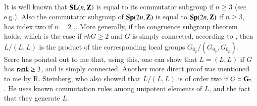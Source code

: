 \subsection{}\label{art04-sec2.5}
It is well known that $\textbf{SL}(n,\mathbf{Z})$ is equal to its commutator subgroup if $n\geq 3$ (see \cite{art04-key3} e.g.). Also the commutator subgroup of $\mathbf{Sp}(2n,\mathbf{Z})$ is equal to $\mathbf{Sp}(2n,\mathbf{Z})$ if $n\geq 3$, has index two if $n=2$ \cite{art04-key3},\pageoriginale \cite{art04-key28}. More generally, if the congruence subgroup theorem holds, which is the case if $rkG\geq 2$ and $G$ is simply connected, according to \cite{art04-key22}, then $L/(L,L)$ is the product of the corresponding local groups $G_{0_{p}}/(G_{0_{p}},G_{0_{p}})$. Serre has pointed out to me that, using this, one can show that $L=(L,L)$ if $G$ has $\operatorname{\mathrm{rank}} \geq 3$, and is simply connected. Another more direct proof was mentioned to me by R. Steinberg, who also showed that $L/(L,L)$ is of order two if $G=\mathbf{G}_{2}$. He uses known commutation rules among unipotent elements of $L$, and the fact that they generate $L$.

